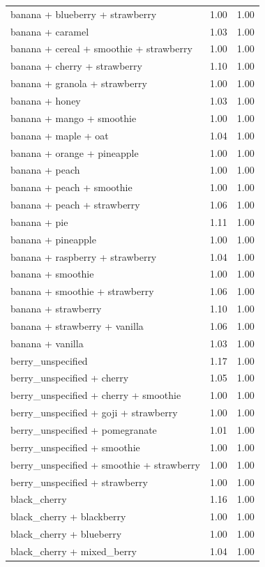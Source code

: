 \begin{table}
\begin{tabular}{lrr}
banana + blueberry + strawberry & 1.00 & 1.00 \\
banana + caramel & 1.03 & 1.00 \\
banana + cereal + smoothie + strawberry & 1.00 & 1.00 \\
banana + cherry + strawberry & 1.10 & 1.00 \\
banana + granola + strawberry & 1.00 & 1.00 \\
banana + honey & 1.03 & 1.00 \\
banana + mango + smoothie & 1.00 & 1.00 \\
banana + maple + oat & 1.04 & 1.00 \\
banana + orange + pineapple & 1.00 & 1.00 \\
banana + peach & 1.00 & 1.00 \\
banana + peach + smoothie & 1.00 & 1.00 \\
banana + peach + strawberry & 1.06 & 1.00 \\
banana + pie & 1.11 & 1.00 \\
banana + pineapple & 1.00 & 1.00 \\
banana + raspberry + strawberry & 1.04 & 1.00 \\
banana + smoothie & 1.00 & 1.00 \\
banana + smoothie + strawberry & 1.06 & 1.00 \\
banana + strawberry & 1.10 & 1.00 \\
banana + strawberry + vanilla & 1.06 & 1.00 \\
banana + vanilla & 1.03 & 1.00 \\
berry\_unspecified & 1.17 & 1.00 \\
berry\_unspecified + cherry & 1.05 & 1.00 \\
berry\_unspecified + cherry + smoothie & 1.00 & 1.00 \\
berry\_unspecified + goji + strawberry & 1.00 & 1.00 \\
berry\_unspecified + pomegranate & 1.01 & 1.00 \\
berry\_unspecified + smoothie & 1.00 & 1.00 \\
berry\_unspecified + smoothie + strawberry & 1.00 & 1.00 \\
berry\_unspecified + strawberry & 1.00 & 1.00 \\
black\_cherry & 1.16 & 1.00 \\
black\_cherry + blackberry & 1.00 & 1.00 \\
black\_cherry + blueberry & 1.00 & 1.00 \\
black\_cherry + mixed\_berry & 1.04 & 1.00 \\

\end{tabular}
\end{table}
